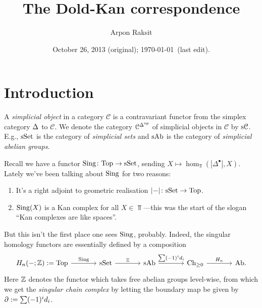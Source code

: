 


\title{The Dold-Kan correspondence}
\author{Arpon Raksit}
\date{October 26, 2013 (original); \today\ (last edit).}


\maketitle
\thispagestyle{fancy}


\renewcommand{\C}{\mathcal{C}}

\section{Introduction}

\begin{definition}
  A \textit{simplicial object} in a category $\C$ is a contravariant
  functor from the simplex category $\Delta$ to $\C$. We denote the
  category $\C^{\Simplex^\op}$ of simplicial objects in $\C$ by
  $\s\C$. E.g., $\mathrm{s}\mathrm{Set}$ is the category of \textit{simplicial sets}
  and $\mathrm{s}\mathrm{Ab}$ is the category of \textit{simplicial abelian groups}.
\end{definition}

\begin{nothing}
  Recall we have a functor $\operatorname{Sing} \colon \mathrm{Top} \to \mathrm{s}\mathrm{Set}$, sending $X
  \mapsto \hom_\Top(|\Delta^\bullet|, X)$. Lately we've been talking
  about $\operatorname{Sing}$ for two reasons:
  \begin{enumerate}
  \item It's a right adjoint to geometric realisation $|{-}| \colon \mathrm{s}\mathrm{Set}
    \to \mathrm{Top}$.
  \item $\operatorname{Sing}(X)$ is a Kan complex for all $X \in \Top$---this was
    the start of the slogan ``Kan complexes are like spaces''.
  \end{enumerate}
  But this isn't the first place one sees $\operatorname{Sing}$, probably. Indeed,
  the singular homology functors are essentially defined by a
  composition
  \[
  \begin{tikzcd}[column sep = large]
    H_n(-;\Z) \ce \Top \rar{\Sing} & \s\Set \rar{\Z} & \s\Ab
    \rar{\sum (-1)^i d_i} & \Ch_{\ge 0} \rar{H_n} & \Ab.
  \end{tikzcd}
  \]
  Here $\mathbb{Z}$ denotes the functor which takes free abelian groups
  level-wise, from which we get the \textit{singular chain complex} by
  letting the boundary map be given by $\partial \mathrel{:=} \sum (-1)^i
  d_i$.
\end{nothing}

